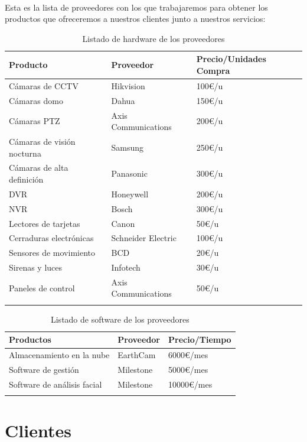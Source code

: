 \documentclass{report}
\begin{document}
        \paragraph*{}
        {
          Esta es la lista de proveedores con los que trabajaremos para obtener los productos que ofreceremos a nuestros clientes junto a nuestros servicios:
        }
        \begin{longtable}{|p{6cm}|p{5cm}|p{4cm}|}
            \hline
            \textbf{Producto} & \textbf{Proveedor} & \textbf{Precio/Unidades Compra}\\
            \hline
            \hline
            Cámaras de CCTV & Hikvision & 100€/u\\
            \hline
            Cámaras domo & Dahua & 150€/u\\
            \hline
            Cámaras PTZ & Axis Communications & 200€/u\\
            \hline
            Cámaras de visión nocturna & Samsung & 250€/u\\
            \hline
            Cámaras de alta definición & Panasonic & 300€/u\\
            \hline
            DVR & Honeywell & 200€/u\\
            \hline
            NVR & Bosch & 300€/u\\
            \hline
            Lectores de tarjetas & Canon & 50€/u\\
            \hline
            Cerraduras electrónicas & Schneider Electric & 100€/u\\
            \hline
            Sensores de movimiento & BCD & 20€/u\\
            \hline
            Sirenas y luces & Infotech & 30€/u\\
            \hline
            Paneles de control & Axis Communications & 50€/u\\
            \hline
            \caption{Listado de hardware de los proveedores}
        \end{longtable}
        \begin{longtable}{|p{6cm}|p{5cm}|p{4cm}|}
          \hline
          \textbf{Productos} & \textbf{Proveedor} & \textbf{Precio/Tiempo}\\
          \hline
          \hline
          Almacenamiento en la nube & EarthCam & 6000€/mes\\
          \hline
          Software de gestión & Milestone & 5000€/mes\\
          \hline
          Software de análisis facial & Milestone & 10000€/mes\\
          \hline
          \caption{Listado de software de los proveedores}
        \end{longtable}
      \clearpage\section{Clientes}
\end{document}
